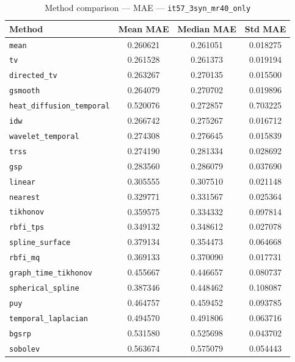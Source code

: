 \begin{table}[ht]
\centering
\caption{Method comparison — MAE — \texttt{it57_3syn_mr40_only}}
\label{tab:mae_it57_3syn_mr40_only}
\begin{tabular}{lccc}
\hline
Method & Mean MAE & Median MAE & Std MAE \\
\hline
\texttt{mean} & 0.260621 & 0.261051 & 0.018275 \\
\texttt{tv} & 0.261528 & 0.261373 & 0.019194 \\
\texttt{directed_tv} & 0.263267 & 0.270135 & 0.015500 \\
\texttt{gsmooth} & 0.264079 & 0.270702 & 0.019896 \\
\texttt{heat_diffusion_temporal} & 0.520076 & 0.272857 & 0.703225 \\
\texttt{idw} & 0.266742 & 0.275267 & 0.016712 \\
\texttt{wavelet_temporal} & 0.274308 & 0.276645 & 0.015839 \\
\texttt{trss} & 0.274190 & 0.281334 & 0.028692 \\
\texttt{gsp} & 0.283560 & 0.286079 & 0.037690 \\
\texttt{linear} & 0.305555 & 0.307510 & 0.021148 \\
\texttt{nearest} & 0.329771 & 0.331567 & 0.025364 \\
\texttt{tikhonov} & 0.359575 & 0.334332 & 0.097814 \\
\texttt{rbfi_tps} & 0.349132 & 0.348612 & 0.027078 \\
\texttt{spline_surface} & 0.379134 & 0.354473 & 0.064668 \\
\texttt{rbfi_mq} & 0.369133 & 0.370090 & 0.017731 \\
\texttt{graph_time_tikhonov} & 0.455667 & 0.446657 & 0.080737 \\
\texttt{spherical_spline} & 0.387346 & 0.448462 & 0.108087 \\
\texttt{puy} & 0.464757 & 0.459452 & 0.093785 \\
\texttt{temporal_laplacian} & 0.494570 & 0.491806 & 0.063716 \\
\texttt{bgsrp} & 0.531580 & 0.525698 & 0.043702 \\
\texttt{sobolev} & 0.563674 & 0.575079 & 0.054443 \\
\hline
\end{tabular}
\end{table}
